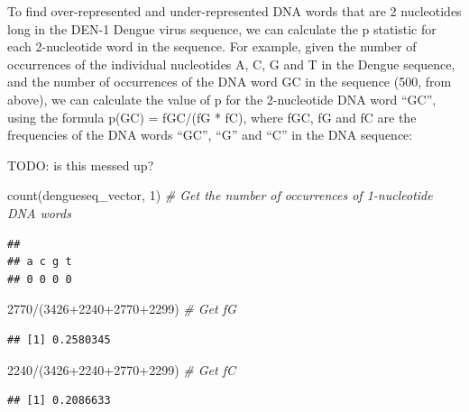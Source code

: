 \documentclass[
]{book}
\newenvironment{Shaded}{\begin{snugshade}}{\end{snugshade}}
\newcommand{\CommentTok}[1]{\textcolor[rgb]{0.56,0.35,0.01}{\textit{#1}}}
\newcommand{\DecValTok}[1]{\textcolor[rgb]{0.00,0.00,0.81}{#1}}
\newcommand{\FunctionTok}[1]{\textcolor[rgb]{0.00,0.00,0.00}{#1}}
\newcommand{\NormalTok}[1]{#1}
\newcommand{\SpecialCharTok}[1]{\textcolor[rgb]{0.00,0.00,0.00}{#1}}
\begin{document}
To find over-represented and under-represented DNA words that are 2 nucleotides long in the DEN-1 Dengue virus sequence, we can calculate the p statistic for each 2-nucleotide word in the sequence. For example, given the number of occurrences of the individual nucleotides A, C, G and T in the Dengue sequence, and the number of occurrences of the DNA word GC in the sequence (500, from above), we can calculate the value of p for the 2-nucleotide DNA word ``GC'', using the formula p(GC) = fGC/(fG * fC), where fGC, fG and fC are the frequencies of the DNA words ``GC'', ``G'' and ``C'' in the DNA sequence:

TODO: is this messed up?

\begin{Shaded}
\begin{Highlighting}[]
\FunctionTok{count}\NormalTok{(dengueseq\_vector, }\DecValTok{1}\NormalTok{) }\CommentTok{\# Get the number of occurrences of 1{-}nucleotide DNA words}
\end{Highlighting}
\end{Shaded}

\begin{verbatim}
## 
## a c g t 
## 0 0 0 0
\end{verbatim}

\begin{Shaded}
\begin{Highlighting}[]
 \DecValTok{2770}\SpecialCharTok{/}\NormalTok{(}\DecValTok{3426}\SpecialCharTok{+}\DecValTok{2240}\SpecialCharTok{+}\DecValTok{2770}\SpecialCharTok{+}\DecValTok{2299}\NormalTok{) }\CommentTok{\# Get fG}
\end{Highlighting}
\end{Shaded}

\begin{verbatim}
## [1] 0.2580345
\end{verbatim}

\begin{Shaded}
\begin{Highlighting}[]
 \DecValTok{2240}\SpecialCharTok{/}\NormalTok{(}\DecValTok{3426}\SpecialCharTok{+}\DecValTok{2240}\SpecialCharTok{+}\DecValTok{2770}\SpecialCharTok{+}\DecValTok{2299}\NormalTok{) }\CommentTok{\# Get fC}
\end{Highlighting}
\end{Shaded}

\begin{verbatim}
## [1] 0.2086633
\end{verbatim}
\end{document}

